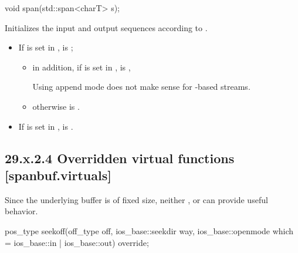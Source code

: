\documentclass[ebook,11pt,article]{memoir}
\begin{document}
\begin{itemdecl}
void span(std::span<charT> s);
\end{itemdecl}

\begin{itemdescr}
\pnum
\effects 
{} Initializes the input and output sequences according to .


\pnum
\postconditions 
\begin{itemize}
\item If  is set in , 
 \tcode{\&\&}  is ; 
\begin{itemize}
\item in addition, 
if  is set in ,
 is , 
\begin{note}
Using append mode does not make sense for -based streams.
\end{note}
\item otherwise  is . 
\end{itemize}
\item If  is set in , 
 \tcode{\&\&}   \tcode{\&\&}  is .
\end{itemize}


\end{itemdescr}

\subsection{29.x.2.4 Overridden virtual functions [spanbuf.virtuals]}
\pnum
\begin{note}
Since the underlying buffer is of fixed size, neither ,  or  can provide useful behavior.
\end{note}

\begin{itemdecl}
pos_type seekoff(off_type off, ios_base::seekdir way,
                 ios_base::openmode which
                   = ios_base::in | ios_base::out) override;
\end{itemdecl}
\end{document}

